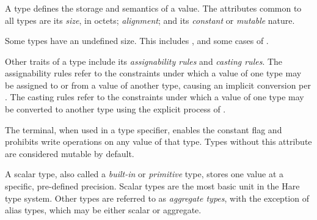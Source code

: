 
\begin{grammar}
 \\
	 \\
	 \\
	 \\
	 \\
	 \\
	 \\
	  \\

 \\
	 \\
	 \\
	 \\
	 \\
	 \\
	 \\
\end{grammar}

\specsubitem
A type defines the storage and semantics of a value. The attributes common to
all types are its \textit{size}, in octets; \textit{alignment}; and its
\textit{constant} or \textit{mutable} nature.

\specsubitem
Some types have an undefined size. This includes ,
and some cases of .

\specsubitem
Other traits of a type include its \textit{assignability rules} and
\textit{casting rules}. The assignability rules refer to the constraints under
which a value of one type may be assigned to or from a value of another type,
causing an implicit conversion per . The casting rules
refer to the constraints under which a value of one type may be converted to
another type using the explicit process of .

\specsubitem
The  terminal, when used in a type specifier, enables the
constant flag and prohibits write operations on any value of that type. Types
without this attribute are considered mutable by default.

\specsubitem
A scalar type, also called a \textit{built-in} or \textit{primitive} type,
stores one value at a specific, pre-defined precision. Scalar types are the
most basic unit in the Hare type system. Other types are referred to as
\textit{aggregate types}, with the exception of alias types, which may be
either scalar or aggregate.

